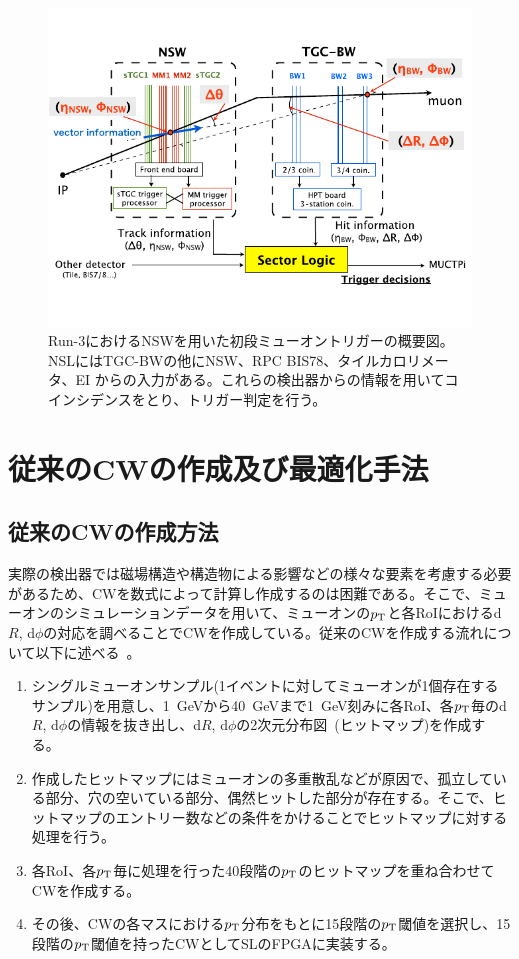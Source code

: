 \begin{figure}[tb]
  \centering
  \includegraphics[clip, width=14cm]{fig/2/NSW_innercoin.pdf}
  \caption{Run-3におけるNSWを用いた初段ミューオントリガーの概要図\cite{article:phase1}。NSLにはTGC-BWの他にNSW、RPC BIS78、タイルカロリメータ、EI からの入力がある。これらの検出器からの情報を用いてコインシデンスをとり、トリガー判定を行う。}
  \label{fig:NSW_inner}
\end{figure}


\section{従来のCWの作成及び最適化手法}\label{section:最適化}
\subsection{従来のCWの作成方法}
実際の検出器では磁場構造や構造物による影響などの様々な要素を考慮する必要があるため、CWを数式によって計算し作成するのは困難である。そこで、ミューオンのシミュレーションデータを用いて、ミューオンの$p_{\rm{T}}$と各RoIにおけるd$R$, d$\phi$の対応を調べることでCWを作成している。従来のCWを作成する流れについて以下に述べる~\cite{article:shiomi-mron}。
\begin{enumerate}\label{table:makeCW}
   \item シングルミューオンサンプル(1イベントに対してミューオンが1個存在するサンプル)を用意し、1~GeVから40~GeVまで1~GeV刻みに各RoI、各$p_{\rm{T}}$毎のd$R$, d$\phi$の情報を抜き出し、d$R$, d$\phi$の2次元分布図~(ヒットマップ)を作成する。
   \item 作成したヒットマップにはミューオンの多重散乱などが原因で、孤立している部分、穴の空いている部分、偶然ヒットした部分が存在する。そこで、ヒットマップのエントリー数などの条件をかけることでヒットマップに対する処理を行う。
   \item 各RoI、各$p_{\rm{T}}$毎に処理を行った40段階の$p_{\rm{T}}$のヒットマップを重ね合わせてCWを作成する。
   \item その後、CWの各マスにおける$p_{\rm{T}}$分布をもとに15段階の$p_{\rm{T}}$閾値を選択し、15段階の$p_{\rm{T}}$閾値を持ったCWとしてSLのFPGAに実装する。
\end{enumerate}



